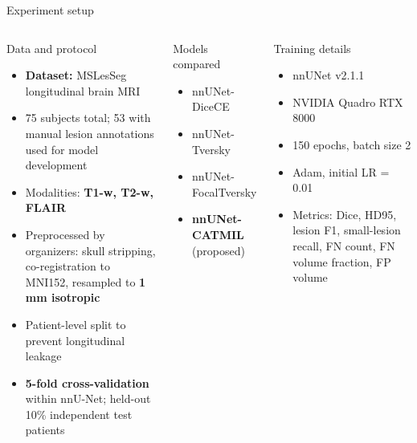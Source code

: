 \documentclass[10pt,aspectratio=169]{beamer}
\begin{document}
\begin{frame}{Experiment setup}
\begin{columns}[T,totalwidth=\textwidth]
\begin{block}{Data and protocol}
\small
\begin{itemize}
  \item \textbf{Dataset:} MSLesSeg longitudinal brain MRI
  \item 75 subjects total; 53 with manual lesion annotations used for model development
  \item Modalities: \textbf{T1-w, T2-w, FLAIR}
  \item Preprocessed by organizers: skull stripping, co-registration to MNI152, resampled to \textbf{1 mm isotropic}
  \item Patient-level split to prevent longitudinal leakage
  \item \textbf{5-fold cross-validation} within nnU-Net; held-out 10\% independent test patients
\end{itemize}
\end{block}

\begin{block}{Models compared}
\small
\begin{itemize}
  \item nnUNet-DiceCE
  \item nnUNet-Tversky
  \item nnUNet-FocalTversky
  \item \textbf{nnUNet-CATMIL} (proposed)
\end{itemize}
\end{block}

\begin{block}{Training details}
\small
\begin{itemize}
  \item nnUNet v2.1.1
  \item NVIDIA Quadro RTX 8000
  \item 150 epochs, batch size 2
  \item Adam, initial LR = 0.01
  \item Metrics: Dice, HD95, lesion F1, small-lesion recall, FN count, FN volume fraction, FP volume
\end{itemize}
\end{block}
\end{columns}
\end{frame}
\end{document}
